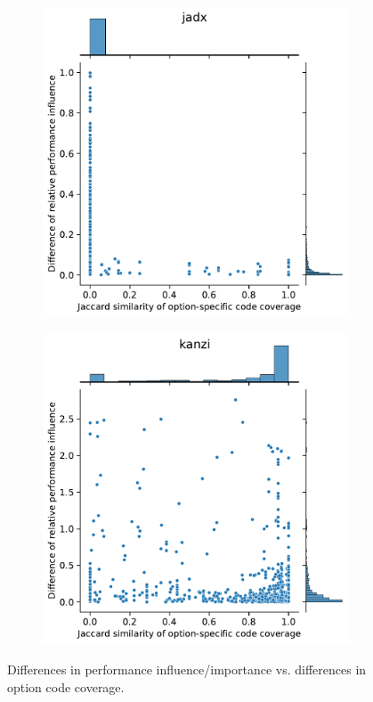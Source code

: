 \begin{figure}
\begin{subfigure}{0.33\textwidth}
	\end{subfigure}
	\begin{subfigure}{0.33\textwidth}
		\centering
		\includegraphics[width=\linewidth]{images/rq3.2/jadx_rq3.2.pdf}
	\end{subfigure}
	\begin{subfigure}{0.33\textwidth}
		\centering
		\includegraphics[width=\linewidth]{images/rq3.2/kanzi_rq3.2.pdf}
	\end{subfigure}
	\caption{Differences in performance influence/importance vs. differences in option code coverage.}
	\label{fig:diff_performance_option_coverage}
\end{figure}


